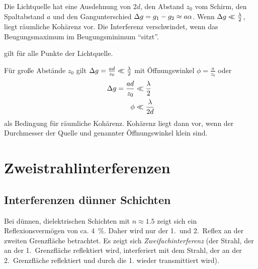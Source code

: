 Die Lichtquelle hat eine Ausdehnung von $2d$, den Abstand $z_0$ vom Schirm,
den Spaltabstand $a$ und den Gangunterschied $\Delta g=g_1-g_2\approx a\alpha$.
Wenn $\Delta g\ll\frac{\lambda}{2}$, liegt räumliche Kohärenz vor. Die
Interferenz verschwindet, wenn das Beugungsmaximum im Beugungsminimum
\enquote{sitzt}.

 gilt für alle Punkte der Lichtquelle.

Für große Abstände $z_0$ gilt $\Delta g=\frac{ad}{z_0}\ll\frac{\lambda}{2}$
mit Öffnungswinkel $\phi=\frac{a}{z_0}$ oder
\begin{align*}
  \Delta g = \frac{ad}{z_0} &\ll \frac{\lambda}{2}\\
  \phi &\ll \frac{\lambda}{2d}
\end{align*}
als Bedingung für räumliche Kohärenz. Kohärenz liegt dann vor, wenn
der Durchmesser der Quelle und genannter Öffnungswinkel klein sind.


\section{Zweistrahlinterferenzen}
\subsection{Interferenzen dünner Schichten}
Bei dünnen, dielektrischen Schichten mit $n\approx\num{1.5}$ zeigt
sich ein Reflexionsvermögen von ca. \SI{4}{\percent}.
Daher wird nur der 1.~und 2.~Reflex an der zweiten Grenzfläche
betrachtet. Es zeigt sich \emph{Zweifachinterferenz} (der Strahl, der an der
1.~Grenzfläche reflektiert wird, interferiert mit dem Strahl, der an der
2.~Grenzfläche reflektiert und durch die 1. wieder transmittiert wird).

